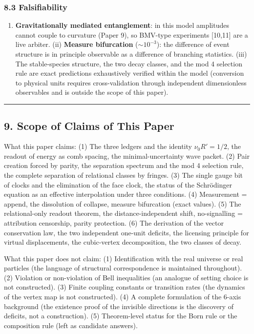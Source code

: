 \documentclass[
]{article}
\providecommand{\tightlist}{%
  \setlength{\itemsep}{0pt}\setlength{\parskip}{0pt}}
\begin{document}
\subsubsection{8.3 Falsifiability}\label{falsifiability}

\begin{enumerate}
\def\labelenumi{(\roman{enumi})}
\tightlist
\item
  \textbf{Gravitationally mediated entanglement}: in this model
  amplitudes cannot couple to curvature (Paper 9), so BMV-type
  experiments {[}10,11{]} are a live arbiter. (ii) \textbf{Measure
  bifurcation} (\(\sim10^{-3}\)): the difference of event structure is
  in principle observable as a difference of branching statistics. (iii)
  The stable-species structure, the two decay classes, and the mod 4
  selection rule are exact predictions exhaustively verified within the
  model (conversion to physical units requires cross-validation through
  independent dimensionless observables and is outside the scope of this
  paper).
\end{enumerate}

\begin{center}\rule{0.5\linewidth}{0.5pt}\end{center}

\subsection{9. Scope of Claims of This
Paper}\label{scope-of-claims-of-this-paper}

What this paper claims: (1) The three ledgers and the identity
\(\nu_0R'=1/2\), the readout of energy as comb spacing, the
minimal-uncertainty wave packet. (2) Pair creation forced by parity, the
separation spectrum and the mod 4 selection rule, the complete
separation of relational classes by fringes. (3) The single gauge bit of
clocks and the elimination of the face clock, the status of the
Schrödinger equation as an effective interpolation under three
conditions. (4) Measurement = append, the dissolution of collapse,
measure bifurcation (exact values). (5) The relational-only readout
theorem, the distance-independent shift, no-signalling = attribution
censorship, parity protection. (6) The derivation of the vector
conservation law, the two independent one-unit deficits, the licensing
principle for virtual displacements, the cubic-vertex decomposition, the
two classes of decay.

What this paper does not claim: (1) Identification with the real
universe or real particles (the language of structural correspondence is
maintained throughout). (2) Violation or non-violation of Bell
inequalities (an analogue of setting choice is not constructed). (3)
Finite coupling constants or transition rates (the dynamics of the
vertex map is not constructed). (4) A complete formulation of the 6-axis
background (the existence proof of the invisible directions is the
discovery of deficits, not a construction). (5) Theorem-level status for
the Born rule or the composition rule (left as candidate answers).
\end{document}

